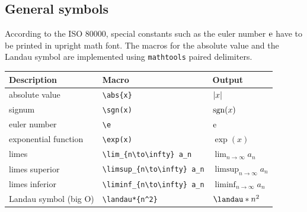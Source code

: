 \documentclass[DIV=13]{scrartcl}
\begin{document}
\subsection{General symbols}
According to the ISO \num{80000}, special constants such as the euler number
$\mathrm{e}$ have to be printed in upright math font. The macros for the absolute
value and the Landau symbol are implemented using \texttt{mathtools}
paired delimiters.
\begin{center}
  \begin{tabular}{lll}
    \toprule
    \textbf{Description}  & \textbf{Macro}   & \textbf{Output}     \\
    \midrule
    absolute value        & \verb|\abs{x}|   & $\lvert x\rvert$           \\
    signum                & \verb|\sgn(x)|   & $\operatorname{sgn}(x)$           \\
    \midrule
    euler number          & \verb|\e|        & $\mathrm{e}$                \\
    exponential function  & \verb|\exp(x)|   & $\exp(x)$           \\
    \midrule
    limes                 & \verb|\lim_{n\to\infty} a_n|
                          & $\lim_{n\to\infty} a_n$                \\
    limes superior        & \verb|\limsup_{n\to\infty} a_n|
                          & $\limsup_{n\to\infty} a_n$             \\
    limes inferior        & \verb|\liminf_{n\to\infty} a_n|
                          & $\liminf_{n\to\infty} a_n$             \\
    \midrule
    Landau symbol (big O) & \verb|\landau*{n^2}| & $\landau*{n^2}$ \\
    \bottomrule
  \end{tabular}
\end{center}
\end{document}
